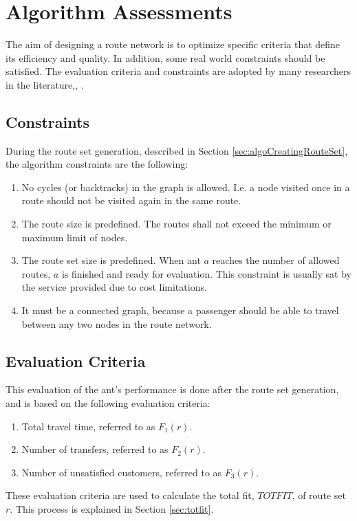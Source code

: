 \section{Algorithm Assessments}
The aim of designing a route network is to optimize specific criteria that define its efficiency and quality. In addition, some real world constraints should be satisfied. The evaluation criteria and constraints are adopted by many researchers in the literature\citep{kechagiopoulos14},\citep{fan09}, \citep{nikolic14}.

\subsection{Constraints}
\label{sec:algoConstraints}
During the route set generation, described in Section \vref{sec:algoCreatingRouteSet}, the algorithm constraints are the following:
\begin{enumerate}
\item \label{itm:constraintCycles} No cycles (or backtracks) in the graph is allowed. I.e. a node visited once in a route should not be visited again in the same route. 
\item \label{itm:constraintRouteSize} The route size is predefined. The routes shall not exceed the minimum or maximum limit of nodes.
\item \label{itm:constraintRouteSetSize} The route set size is predefined. When ant $a$ reaches the number of allowed routes, $a$ is finished and ready for evaluation. This constraint is usually sat by the service provided due to cost limitations.
\item \label{itm:criteriaConnectedGraph} It must be a connected graph, because a passenger should be able to travel between any two nodes in the route network.
\end{enumerate}

\subsection{Evaluation Criteria} 
This evaluation of the ant's performance is done after the route set generation, and is based on the following evaluation criteria:
\begin{enumerate}
\item \label{itm:criteriaTotalTravelTime} Total travel time, referred to as $F_1(r)$.
\item \label{itm:f2} Number of transfers, referred to as $F_2(r)$.
\item Number of unsatisfied customers, referred to as $F_3(r)$. 
\end{enumerate}
These evaluation criteria are used to calculate the total fit, $TOTFIT$, of route set $r$. This process is explained in Section \vref{sec:totfit}.



